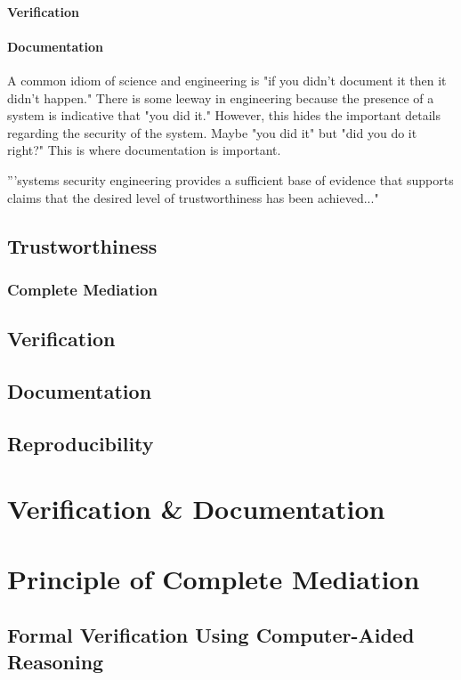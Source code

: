 \documentclass[../../main/main.tex]{subfiles}
\begin{document}
\paragraph*{Verification}

\paragraph*{Documentation}
A common idiom of science and engineering is "if you didn't document it then it didn't happen."  There is some leeway in engineering because the presence of a system is indicative that "you did it." However, this hides the important details regarding the security of the system.  Maybe "you did it" but "did you do it right?"  This is where documentation is important. 

'''systems security engineering provides a sufficient base of evidence that supports claims that the desired level of trustworthiness has been achieved..."


\subsection{Trustworthiness}\label{ssec:trustworthiness}
\subsubsection{Complete Mediation}\label{sssec:completemediation}

\subsection{Verification}\label{ssec:verification}
\subsection{Documentation}\label{ssec:documentation}
\subsection{Reproducibility}\label{ssec:reproducibility}

\section{Verification \& Documentation}

\section{Principle of Complete Mediation}

\subsection{Formal Verification Using Computer-Aided Reasoning}
\end{document}
